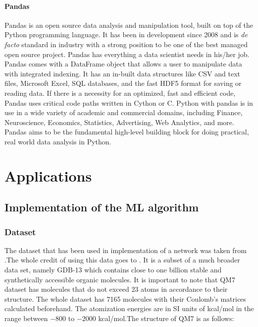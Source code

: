 \documentclass[a4paper,oneside,openright,11pt]{book}
\begin{document}
\subsection{Pandas}

Pandas \cite{pandas} is an open source data analysis and manipulation tool, built on top of the Python programming language. It has been in development since 2008 and is \emph{de facto} standard in industry with a strong position to be one of the best managed open source project. Pandas has everything a data scientist needs in his/her job. Pandas comes with a DataFrame object that allows a user to manipulate data with integrated indexing. It has an in-built data structures like CSV and text files, Microsoft Excel, SQL databases, and the fast HDF5 format for saving or reading data. If there is a necessity for an optimized, fast and efficient code, Pandas uses critical code paths written in Cython or C. Python with pandas is in use in a wide variety of academic and commercial domains, including Finance, Neuroscience, Economics, Statistics, Advertising, Web Analytics, and more. Pandas aims to be the fundamental high-level building block for doing practical, real world data analysis in Python.




\part{Applications}

\chapter{Implementation of the ML algorithm}

\section{Dataset}

The dataset that has been used in implementation of a network was taken from \cite{dataset}.The whole credit of using this data goes to \cite{blum} \cite{rupp}. It is a subset of a much broader data set, namely GDB-13 which contains close to one billion stable and synthetically accessible organic molecules. It is important to note that QM7 dataset has molecules that do not exceed 23 atoms in accordance to their structure. The whole dataset has 7165 molecules with their Coulomb's matrices calculated beforehand. The atomization energies are in SI units of kcal/mol in the range between $-800$ to $-2000$ kcal/mol.The structure of QM7 is as follows:
\end{document}
